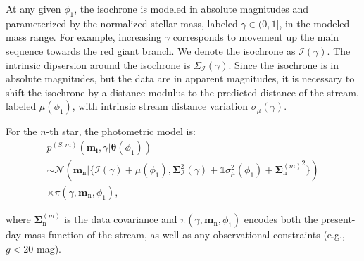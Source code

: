 \documentclass[twocolumn]{aastex631}
\newcommand{\mrm}[1]{\mathrm{#1}}
\newcommand{\mbs}[1]{\boldsymbol{#1}}
\newcommand{\mcal}[1]{\mathcal{#1}}
\newcommand{\pdf}{p}
\newcommand{\prior}{\mcal{\pi}}
\newcommand{\nth}[1]{{#1}_{\mrm{n}}}  %
\newcommand{\smallcomponent}[2]{#2^{\scriptscriptstyle (#1)}}
\newcommand{\cmp}[2]{\smallcomponent{#1}{#2}}
\begin{document}
            At any given $\phi_1$, the isochrone is modeled in absolute
            magnitudes and parameterized by the normalized stellar mass, labeled
            $\gamma \in (0, 1]$, in the modeled mass range. For example,
            increasing $\gamma$ corresponds to movement up the main sequence
            towards the red giant branch. We denote the isochrone as
            $\mcal{I(\gamma)}$. The intrinsic dipsersion around the isochrone is
            $\Sigma_\mcal{I}(\gamma)$. Since the isochrone is in absolute
            magnitudes, but the data are in apparent magnitudes, it is necessary
            to shift the isochrone by a distance modulus to the predicted
            distance of the stream, labeled  $\mu(\phi_1)$, with intrinsic
            stream distance variation $\sigma_\mu(\gamma)$.
            
            For the $n$-th star, the photometric model is:
            \begin{multline} \label{eq:photometric_probability_point}
                \cmp{S,m}{\pdf}(\mbs{m_i}, \gamma | \mbs{\theta}(\phi_1)) 
                \\ \sim \mcal{N}(\nth{\mbs{m}} | \{\mcal{I(\gamma)} + \mu(\phi_1), \mbs{\Sigma}_{\mcal{I}}^2(\gamma) + \mathds{1} \sigma_\mu^2(\phi_1) + {\cmp{m}{\nth{\mbs{\Sigma}}}}^2 \}) \\ \times \prior(\gamma, \nth{\mbs{m}}, \phi_1),
            \end{multline}
    
            where $\cmp{m}{\nth{\mbs{\Sigma}}}$ is the data covariance and
            $\prior(\gamma, \nth{\mbs{m}}, \phi_1)$ encodes both the present-day
            mass function of the stream, as well as any observational
            constraints (e.g., $g < 20$ mag).
\end{document}
